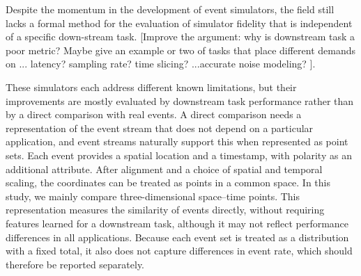 



Despite the momentum in the development of event simulators, the field still lacks a formal method for the evaluation of simulator fidelity that is independent of a specific down-stream task.  [Improve the argument:  why is downstream task a poor metric?  Maybe give an example or two of tasks that place different demands on ... latency?  sampling rate?  time slicing? ...accurate noise modeling? ].  




These simulators each address different known limitations, but their improvements are mostly evaluated by downstream task performance rather than by a direct comparison with real events. A direct comparison needs a representation of the event stream that does not depend on a particular application, and event streams naturally support this when represented as point sets. Each event provides a spatial location and a timestamp, with polarity as an additional attribute. After alignment and a choice of spatial and temporal scaling, the coordinates can be treated as points in a common space. In this study, we mainly compare three-dimensional space--time points. This representation measures the similarity of events directly, without requiring features learned for a downstream task, although it may not reflect performance differences in all applications. Because each event set is treated as a distribution with a fixed total, it also does not capture differences in event rate, which should therefore be reported separately.

